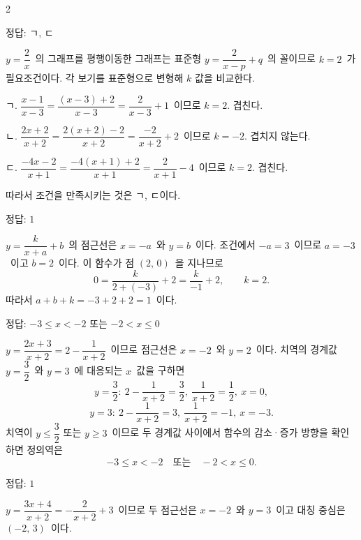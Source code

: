 \documentclass[10pt,fleqn]{article}
\begin{document}
\begin{multicols*}{2}
\begin{dmanswerbox}
정답: ㄱ, ㄷ
\end{dmanswerbox}

$y=\dfrac{2}{x}$\ 의 그래프를 평행이동한 그래프는 표준형 $y=\dfrac{2}{x-p}+q$\ 의 꼴이므로 $k=2$\ 가 필요조건이다. 각 보기를 표준형으로 변형해 $k$ 값을 비교한다.

\smallskip
ㄱ. $\dfrac{x-1}{x-3}=\dfrac{(x-3)+2}{x-3}=\dfrac{2}{x-3}+1$\ 이므로 $k=2$. 겹친다.

\smallskip
ㄴ. $\dfrac{2x+2}{x+2}=\dfrac{2(x+2)-2}{x+2}=\dfrac{-2}{x+2}+2$\ 이므로 $k=-2$. 겹치지 않는다.

\smallskip
ㄷ. $\dfrac{-4x-2}{x+1}=\dfrac{-4(x+1)+2}{x+1}=\dfrac{2}{x+1}-4$\ 이므로 $k=2$. 겹친다.

\smallskip
따라서 조건을 만족시키는 것은 ㄱ, ㄷ이다.
\begin{dmanswerbox}
정답: $1$
\end{dmanswerbox}

$y=\dfrac{k}{x+a}+b$\ 의 점근선은 $x=-a$\ 와 $y=b$\ 이다. 조건에서 $-a=3$\ 이므로 $a=-3$\ 이고 $b=2$\ 이다. 이 함수가 점 $(2,\, 0)$\ 을 지나므로
\[ 0=\dfrac{k}{2+(-3)}+2=\dfrac{k}{-1}+2,\qquad k=2. \]
따라서 $a+b+k=-3+2+2=1$\ 이다.

\begin{dmanswerbox}
정답: $-3\le x<-2$ 또는 $-2<x\le 0$
\end{dmanswerbox}

$y=\dfrac{2x+3}{x+2}=2-\dfrac{1}{x+2}$\ 이므로 점근선은 $x=-2$\ 와 $y=2$\ 이다. 치역의 경계값 $y=\dfrac{3}{2}$\ 와 $y=3$\ 에 대응되는 $x$\ 값을 구하면
\[ y=\dfrac{3}{2}:\ 2-\dfrac{1}{x+2}=\dfrac{3}{2},\ \dfrac{1}{x+2}=\dfrac{1}{2},\ x=0, \]
\[ y=3:\ 2-\dfrac{1}{x+2}=3,\ \dfrac{1}{x+2}=-1,\ x=-3. \]
치역이 $y\le \dfrac{3}{2}$ 또는 $y\ge 3$\ 이므로 두 경계값 사이에서 함수의 감소·증가 방향을 확인하면 정의역은
\[ -3\le x<-2\quad\text{또는}\quad -2<x\le 0. \]

\begin{dmanswerbox}
정답: $1$
\end{dmanswerbox}

$y=\dfrac{3x+4}{x+2}=-\dfrac{2}{x+2}+3$\ 이므로 두 점근선은 $x=-2$\ 와 $y=3$\ 이고 대칭 중심은 $(-2,\, 3)$\ 이다.


\end{multicols*}
\end{document}
